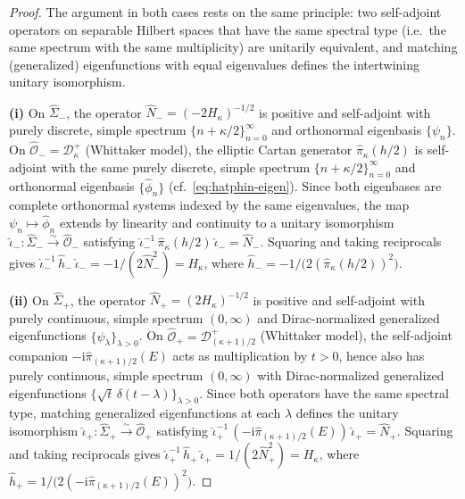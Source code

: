 \documentclass[10pt,a4paper]{amsart}
\newcommand{\D}{\mathcal{D}}
\newcommand{\OOh}{\widehat{\mathcal{O}}}
\newcommand{\Sigmah}{\widehat{\Sigma}}
\newcommand{\ii}{\mathrm{i}}
\begin{document}
\begin{proof}
The argument in both cases rests on the same principle: two self-adjoint
operators on separable Hilbert spaces that have the same spectral type
(i.e.\ the same spectrum with the same multiplicity) are unitarily
equivalent, and matching (generalized) eigenfunctions with equal
eigenvalues defines the intertwining unitary isomorphism.

\smallskip\noindent\textbf{(i)}
On $\Sigmah_{-}$, the operator
$\hat N_{-}=(-2H_{\kappa})^{-1/2}$ is positive and self-adjoint with
purely discrete, simple spectrum
$\{n+\kappa/2\}_{n=0}^{\infty}$ and orthonormal eigenbasis
$\{\psi_{n}\}$.
On $\OOh_{-}=\D^{+}_{\kappa}$ (Whittaker model), the elliptic Cartan
generator $\hat\pi_{\kappa}(h/2)$ is self-adjoint with the same purely
discrete, simple spectrum $\{n+\kappa/2\}_{n=0}^{\infty}$ and
orthonormal eigenbasis $\{\hat\phi_{n}\}$
(cf.~\eqref{eq:hatphin-eigen}).
Since both eigenbases are complete orthonormal systems indexed by the
same eigenvalues, the map $\psi_{n}\mapsto\hat\phi_{n}$ extends by
linearity and continuity to a unitary isomorphism
$\hat\iota_{-}\colon\Sigmah_{-}\xrightarrow{\sim}\OOh_{-}$
satisfying $\hat\iota_{-}^{-1}\,\hat\pi_{\kappa}(h/2)\,\hat\iota_{-}
=\hat N_{-}$.
Squaring and taking reciprocals gives
$\hat\iota_{-}^{-1}\,\hat h_{-}\,\hat\iota_{-}
=-1/(2\hat N_{-}^{2})=H_{\kappa}$, where
$\hat h_{-}=-1/\bigl(2(\hat\pi_{\kappa}(h/2))^{2}\bigr)$.

\smallskip\noindent\textbf{(ii)}
On $\Sigmah_{+}$, the operator
$\hat N_{+}=(2H_{\kappa})^{-1/2}$ is positive and self-adjoint with
purely continuous, simple spectrum $(0,\infty)$ and Dirac-normalized
generalized eigenfunctions $\{\psi_{\lambda}\}_{\lambda>0}$.
On $\OOh_{+}=\D^{+}_{(\kappa+1)/2}$ (Whittaker model), the self-adjoint
companion $-\ii\hat\pi_{(\kappa+1)/2}(E)$ acts as
multiplication by $t>0$, hence also has purely continuous, simple
spectrum $(0,\infty)$ with Dirac-normalized generalized eigenfunctions
$\{\sqrt{t}\,\delta(t-\lambda)\}_{\lambda>0}$.
Since both operators have the same spectral type, matching generalized
eigenfunctions at each $\lambda$ defines the unitary isomorphism
$\hat\iota_{+}\colon\Sigmah_{+}\xrightarrow{\sim}\OOh_{+}$
satisfying $\hat\iota_{+}^{-1}\,(-\ii\hat\pi_{(\kappa+1)/2}(E))\,\hat\iota_{+}
=\hat N_{+}$.
Squaring and taking reciprocals gives
$\hat\iota_{+}^{-1}\,\hat h_{+}\,\hat\iota_{+}
=1/(2\hat N_{+}^{2})=H_{\kappa}$, where
$\hat h_{+}=1/\bigl(2(-\ii\hat\pi_{(\kappa+1)/2}(E))^{2}\bigr)$.
\end{proof}
\end{document}
